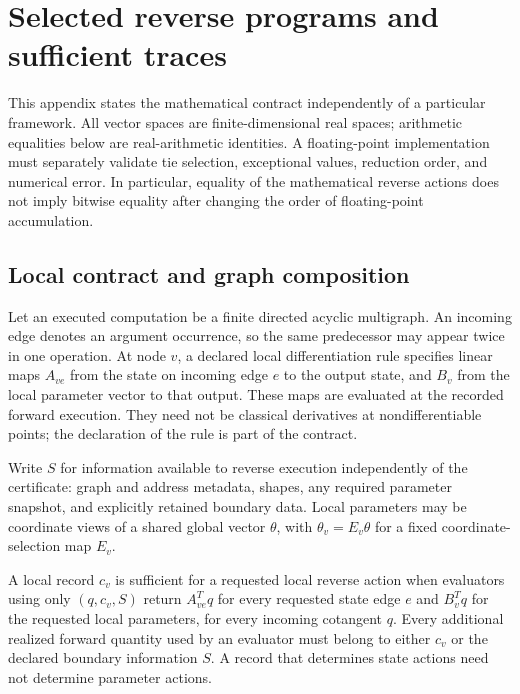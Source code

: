 \section{Selected reverse programs and sufficient traces}
\label{app:theory}

This appendix states the mathematical contract independently of a particular
framework. All vector spaces are finite-dimensional real spaces; arithmetic
equalities below are real-arithmetic identities. A floating-point
implementation must separately validate tie selection, exceptional values,
reduction order, and numerical error. In particular, equality of the
mathematical reverse actions does not imply bitwise equality after changing
the order of floating-point accumulation.

\subsection{Local contract and graph composition}
\label{app:composition}

Let an executed computation be a finite directed acyclic multigraph.
An incoming edge denotes an argument occurrence, so the same predecessor may
appear twice in one operation. At node $v$, a declared local differentiation
rule specifies linear maps $A_{ve}$ from the state on incoming edge $e$ to
the output state, and $B_v$ from the local parameter vector to that output.
These maps are evaluated at the recorded forward execution. They need not be
classical derivatives at nondifferentiable points; the declaration of the
rule is part of the contract.

Write $S$ for information available to reverse execution independently of the
certificate: graph and address metadata, shapes, any required parameter
snapshot, and explicitly retained boundary data. Local parameters may be
coordinate views of a shared global vector $\theta$, with
$\theta_v=E_v\theta$ for a fixed coordinate-selection map $E_v$.

\begin{definition}
\label{def:joint-trace}
A local record $c_v$ is sufficient for a requested local reverse action when
evaluators using only $(q,c_v,S)$ return $A_{ve}^{T}q$ for every requested
state edge $e$ and $B_v^{T}q$ for the requested local parameters, for every
incoming cotangent $q$. Every additional realized forward quantity used by an
evaluator must belong to either $c_v$ or the declared boundary information
$S$. A record that determines state actions need not determine parameter
actions.
\end{definition}

